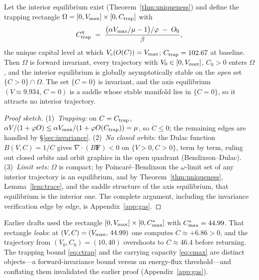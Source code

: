 \begin{theorem}
\label{thm:gas}
Let the interior equilibrium exist (Theorem~\ref{thm:uniqueness}) and define
the trapping rectangle $\Omega=[0,V_{\max}]\times[0,C_{\mathrm{trap}}]$ with
\begin{equation}
\label{eq:ctrap}
C_{\mathrm{trap}}^{\eta} \;=\;
\frac{\bigl(\alpha V_{\max}/\mu-1\bigr)/\varphi \;-\; O_0}{\beta},
\end{equation}
the unique capital level at which $V_c(O(C))=V_{\max}$; $C_{\mathrm{trap}}=102.67$ at
baseline. Then $\Omega$ is forward invariant, every trajectory with
$V_0\in[0,V_{\max}]$, $C_0>0$ enters $\Omega$, and the interior equilibrium is
globally asymptotically stable on the \emph{open} set
$\{C>0\}\cap\Omega$. The set $\{C=0\}$ is invariant, and the axis
equilibrium $(V\approx9.934,\,C=0)$ is a saddle whose stable manifold lies
in $\{C=0\}$, so it attracts no interior trajectory.
\end{theorem}

\begin{proof}[Proof sketch]
(1)~\emph{Trapping:} on $C=C_{\mathrm{trap}}$, $\alpha V/(1+\varphi O)\le
\alpha V_{\max}/(1+\varphi O(C_{\mathrm{trap}}))=\mu$, so $\dot C\le0$; the remaining edges
are handled by \S\ref{sec:invariance}. (2)~\emph{No closed orbits:} the Dulac
function $B(V,C)=1/C$ gives
$\nabla\!\cdot\!(B\mathbf{F})<0$ on $\{V>0,C>0\}$, term by term, ruling out
closed orbits and orbit graphics in the open quadrant (Bendixson--Dulac).
(3)~\emph{Limit sets:} $\Omega$ is compact; by Poincar\'e--Bendixson the
$\omega$-limit set of any interior trajectory is an equilibrium, and by
Theorem~\ref{thm:uniqueness}, Lemma~\ref{lem:trace}, and the saddle structure
of the axis equilibrium, that equilibrium is the interior one. The complete
argument, including the invariance verification edge by edge, is
Appendix~\ref{app:gas}.
\end{proof}

\begin{remark}
\label{rem:ctrap}
Earlier drafts used the rectangle $[0,V_{\max}]\times[0,C^{*}_{\max}]$ with
$C^{*}_{\max}=44.99$. That rectangle \emph{leaks}: at $(V,C)=(V_{\max},\,44.99)$ one
computes $\dot C\approx+6.86>0$, and the trajectory from $(V_0,C_0)=(10,40)$
overshoots to $C\approx46.4$ before returning. The trapping bound
\eqref{eq:ctrap} and the carrying capacity \eqref{eq:cmax} are distinct
objects---a forward-invariance bound versus an energy-flux threshold---and
conflating them invalidated the earlier proof
(Appendix~\ref{app:gas}).
\end{remark}

